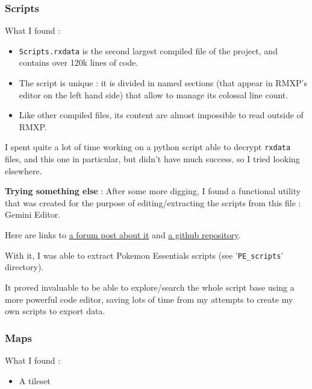 \documentclass[11pt]{article}
\begin{document}
\subsubsection{Scripts}

What I found :
\begin{itemize}
	\item \verb|Scripts.rxdata| is the second largest compiled file of the project, and contains over 120k lines of code.
	
	\item The script is unique : it is divided in named sections (that appear in RMXP's editor on the left hand side) that allow to manage its colossal line count.
	
	\item Like other compiled files, its content are almost impossible to read outside of RMXP.
\end{itemize}

I spent quite a lot of time working on a python script able to decrypt \verb|rxdata| files, and this one in particular, but didn't have much success, so I tried looking elsewhere.

\textbf{Trying something else} : After some more digging, I found a functional utility that was created for the purpose of editing/extracting the scripts from this file : Gemini Editor.

Here are links to \href{https://forum.chaos-project.com/index.php/topic,10420.0.html}{a forum post about it} and \href{https://github.com/terabin/Gemini}{a github repository}.

With it, I was able to extract Pokemon Essentials scripts (see '\verb|PE_scripts|' directory).

It proved invaluable to be able to explore/search the whole script base using a more powerful code editor, saving lots of time from my attempts to create my own scripts to export data.


\subsubsection{Maps}

What I found :
\begin{itemize}
	\item A tileset 
\end{itemize}
\end{document}
